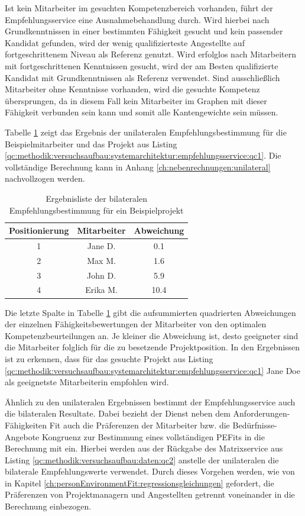 Ist kein Mitarbeiter im gesuchten Kompetenzbereich vorhanden, führt der Empfehlungsservice eine Ausnahmebehandlung durch. Wird hierbei nach Grundkenntnissen in einer bestimmten Fähigkeit gesucht und kein passender Kandidat gefunden, wird der wenig qualifizierteste Angestellte auf fortgeschrittenem Niveau als Referenz genutzt. Wird erfolglos nach Mitarbeitern mit fortgeschrittenen Kenntnissen gesucht, wird der am Besten qualifizierte Kandidat mit Grundkenntnissen als Referenz verwendet. Sind ausschließlich Mitarbeiter ohne Kenntnisse vorhanden, wird die gesuchte Kompetenz übersprungen, da in diesem Fall kein Mitarbeiter im Graphen mit dieser Fähigkeit verbunden sein kann und somit alle Kantengewichte \nullWert sein müssen.

Tabelle \ref{tbl:methodik:versuchsaufbau:unilateral:tbl2} zeigt das Ergebnis der unilateralen Empfehlungsbestimmung für die Beispielmitarbeiter und das Projekt aus Listing \ref{qc:methodik:versuchsaufbau:systemarchitektur:empfehlungsservice:qc1}. Die vollständige Berechnung kann in Anhang \ref{ch:nebenrechnungen:unilateral} nachvollzogen werden.

\begin{table}[h]
	\centering
	\begin{tabular}{c|c|c}
		\textbf{Positionierung} & \textbf{Mitarbeiter} & \textbf{Abweichung}\\
		\hline
		1 & Jane D.  & 0.1\\
		2 & Max M.   & 1.6\\
		3 & John D.  & 5.9\\
		4 & Erika M. & 10.4
	\end{tabular}
	\caption{Ergebnisliste der bilateralen Empfehlungsbestimmung für ein Beispielprojekt}
	\label{tbl:methodik:versuchsaufbau:unilateral:tbl2}
\end{table}

Die letzte Spalte in Tabelle \ref{tbl:methodik:versuchsaufbau:unilateral:tbl2} gibt die aufsummierten quadrierten Abweichungen der einzelnen Fähigkeitsbewertungen der Mitarbeiter von den optimalen Kompetenzbeurteilungen an. Je kleiner die Abweichung ist, desto geeigneter sind die Mitarbeiter folglich für die zu besetzende Projektposition. In den Ergebnissen ist zu erkennen, dass für das gesuchte Projekt aus Listing \ref{qc:methodik:versuchsaufbau:systemarchitektur:empfehlungsservice:qc1} Jane Doe als geeignetste Mitarbeiterin empfohlen wird.

Ähnlich zu den unilateralen Ergebnissen bestimmt der Empfehlungsservice auch die bilateralen Resultate. Dabei bezieht der Dienst neben dem Anforderungen-Fähigkeiten Fit auch die Präferenzen der Mitarbeiter bzw. die Bedürfnisse-Angebote Kongruenz zur Bestimmung eines vollständigen \acp{PEFit} in die Berechnung mit ein. Hierbei werden aus der Rückgabe des Matrixservice aus Listing \ref{qc:methodik:versuchsaufbau:daten:qc2} anstelle der unilateralen die bilaterale Empfehlungswerte verwendet. Durch dieses Vorgehen werden, wie von \textcite[S. 51ff.]{edwards:1991} in Kapitel \ref{ch:personEnvironmentFit:regressionsgleichungen} gefordert, die Präferenzen von Projektmanagern und Angestellten getrennt voneinander in die Berechnung einbezogen.


